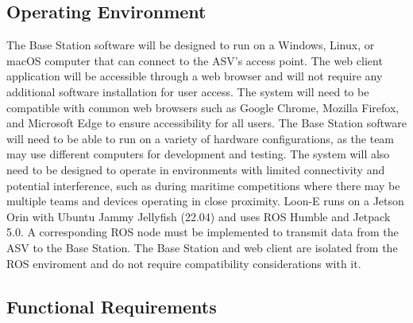 \subsection{Operating Environment}
The Base Station software will be designed to run on a Windows, Linux, or macOS computer that can connect to the ASV's access point. 
The web client application will be accessible through a web browser and will not require any additional software installation for user access. The system will need to be compatible with common web browsers such as Google Chrome, Mozilla Firefox, and Microsoft Edge to ensure accessibility for all users. The Base Station software will need to be able to run on a variety of hardware configurations, as the team may use different computers for development and testing. The system will also need to be designed to operate in environments with limited connectivity and potential interference, such as during maritime competitions where there may be multiple teams and devices operating in close proximity.
Loon-E runs on a Jetson Orin with Ubuntu Jammy Jellyfish (22.04) and uses ROS Humble and Jetpack 5.0. A corresponding ROS node must be implemented to transmit data from the ASV to the Base Station. The Base Station and web client are isolated from the ROS enviroment and do not require compatibility considerations with it.

\subsection{Functional Requirements}

